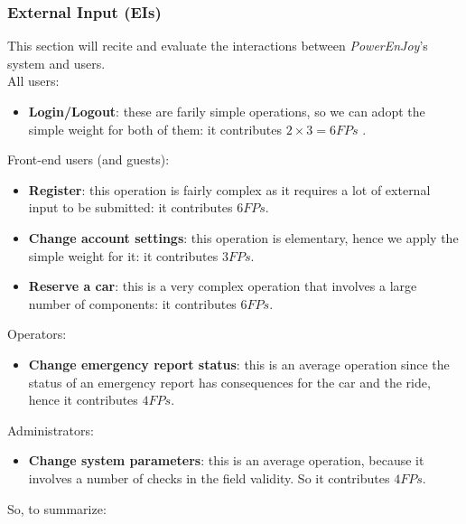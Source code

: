 \subsubsection{External Input (EIs)}
This section will recite and evaluate the interactions between \textit{PowerEnJoy}'s system and users. \\

All users:\\
	\begin{itemize}
		\item \textbf{Login/Logout}: these are farily simple operations, so we can adopt the simple weight for both of them: it contributes $2\times3=6 FPs$ .
	\end{itemize}

Front-end users (and guests):\\ %
	\begin{itemize}
		\item \textbf{Register}: this operation is fairly complex as it requires a lot of external input to be submitted: it contributes $6 FPs$.
		\item \textbf{Change account settings}: this operation is elementary, hence we apply the simple weight for it: it contributes $3 FPs$.
		\item \textbf{Reserve a car}: this is a very complex operation that involves a large number of components: it contributes $6 FPs$.
	\end{itemize}

Operators:\\
	\begin{itemize}
		\item \textbf{Change emergency report status}: this is an average operation since the status of an emergency report has consequences for the car and the ride, hence it contributes $4 FPs$.
	\end{itemize}

Administrators:\\
	\begin{itemize}
		\item \textbf{Change system parameters}: this is an average operation, because it involves a number of checks in the field validity. So it contributes $4 FPs$.
	\end{itemize}

So, to summarize: \\

